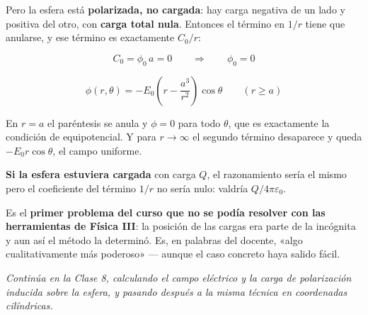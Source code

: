 \documentclass[12pt,a4paper]{article}
\begin{document}
Pero la esfera está \textbf{polarizada, no cargada}: hay carga negativa de un lado
y positiva del otro, con \textbf{carga total nula}. Entonces el término en $1/r$
tiene que anularse, y ese término es exactamente $C_0/r$:

\[
C_0 = \phi_0\,a = 0 \qquad\Longrightarrow\qquad \phi_0 = 0
\]

\[
\boxed{\;\phi(r,\theta) = -E_0\left(r - \frac{a^{3}}{r^{2}}\right)\cos\theta
\qquad (r \ge a)\;}
\]

\begin{notebox}
En $r=a$ el paréntesis se anula y $\phi = 0$ para todo $\theta$, que es
exactamente la condición de equipotencial. Y para $r\to\infty$ el segundo término
desaparece y queda $-E_0 r\cos\theta$, el campo uniforme.

\textbf{Si la esfera estuviera cargada} con carga $Q$, el razonamiento sería el
mismo pero el coeficiente del término $1/r$ no sería nulo: valdría
$Q/4\pi\varepsilon_0$.
\end{notebox}

\begin{keybox}
Es el \textbf{primer problema del curso que no se podía resolver con las
herramientas de Física III}: la posición de las cargas era parte de la incógnita y
aun así el método la determinó. Es, en palabras del docente, «algo
cualitativamente más poderoso» --- aunque el caso concreto haya salido fácil.
\end{keybox}

\bigskip
\noindent\emph{Continúa en la Clase 8, calculando el campo eléctrico y la carga de
polarización inducida sobre la esfera, y pasando después a la misma técnica en
coordenadas cilíndricas.}
\end{document}
